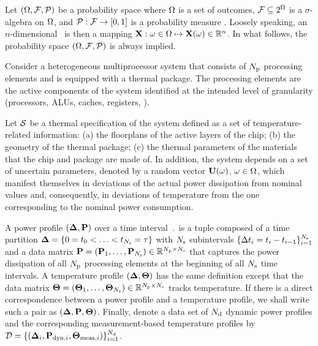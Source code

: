 Let $(\Omega, \mathcal{F}, \mathcal{P})$ be a probability space where $\Omega$ is a set of outcomes, $\mathcal{F} \subseteq 2^\Omega$ is a $\sigma$-algebra on $\Omega$, and $\mathcal{P}: \mathcal{F} \to [0, 1]$ is a probability measure \cite{durrett2010}. Loosely speaking, an $n$-dimensional \rv\ is then a mapping $\mathbf{X}: \omega \in \Omega \mapsto \mathbf{X}(\omega) \in \mathbb{R}^n$. In what follows, the probability space $(\Omega, \mathcal{F}, \mathcal{P})$ is always implied.

Consider a heterogeneous multiprocessor system that consists of ${N_\text{p}}$ processing elements and is equipped with a thermal package. The processing elements are the active components of the system identified at the intended level of granularity (processors, ALUs, caches, registers, \etc).

Let $\mathcal{S}$ be a thermal specification of the system defined as a set of temperature-related information: (a) the floorplans of the active layers of the chip; (b) the geometry of the thermal package; (c) the thermal parameters of the materials that the chip and package are made of. In addition, the system depends on a set of uncertain parameters, denoted by a random vector $\mathbf{U}(\omega)$, $\omega \in \Omega$, which manifest themselves in deviations of the actual power dissipation from nominal values and, consequently, in deviations of temperature from the one corresponding to the nominal power consumption.

A power profile $\profileP$ over a time interval $\period$ is a tuple composed of a time partition $\boldsymbol{\Delta} = \{ 0 = t_0 < \dotsc < t_{N_\text{s}} = \tau \}$ with $N_\text{s}$ subintervals $\{ \Delta t_i = t_i - t_{i - 1} \}_{i = 1}^{N_\text{s}}$ and a data matrix $\mathbf{P} = \left(\mathbf{P}_1, \dotsc, \mathbf{P}_{N_\text{s}} \right) \in \mathbb{R}^{{N_\text{p}} \times N_\text{s}}$ that captures the power dissipation of all ${N_\text{p}}$ processing elements at the beginning of all $N_\text{s}$ time intervals. A temperature profile $\profileT$ has the same definition except that the data matrix $\boldsymbol\Theta = \left( \boldsymbol\Theta_1, \dots, \boldsymbol\Theta_{N_\text{s}} \right) \in \mathbb{R}^{{N_\text{p}} \times N_\text{s}}$ tracks temperature. If there is a direct correspondence between a power profile and a temperature profile, we shall write such a pair as $\left(\boldsymbol{\Delta}, \mathbf{P}, \boldsymbol\Theta\right)$. Finally, denote a data set of $N_\text{d}$ dynamic power profiles and the corresponding measurement-based temperature profiles by $\mathcal{D} = \{ (\boldsymbol{\Delta}_i, \mathbf{P}_{\text{dyn}, i}, \boldsymbol\Theta_{\text{meas}, i}) \}_{i=1}^{N_\text{d}}$.

